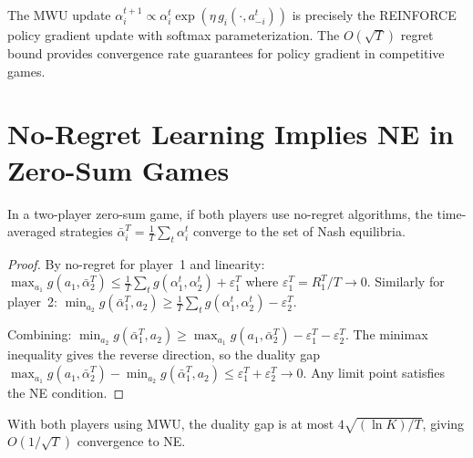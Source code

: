 \documentclass[11pt,a4paper]{article}
\begin{document}
\begin{rlconnection}[title={MWU and Policy Gradient}]
The MWU update $\alpha_i^{t+1} \propto \alpha_i^t\exp(\eta\,g_i(\cdot,
a_{-i}^t))$ is precisely the REINFORCE policy gradient update with
softmax parameterization. The $O(\sqrt{T})$ regret bound provides
convergence rate guarantees for policy gradient in competitive games.
\end{rlconnection}


\section{No-Regret Learning Implies NE in Zero-Sum Games}
\label{sec:no-regret-ne}

\begin{keyresult}[title={No-Regret to Nash Equilibrium}]
\begin{theorem}
\label{thm:no-regret-ne}
In a two-player zero-sum game, if both players use no-regret algorithms,
the time-averaged strategies $\bar{\alpha}_i^T = \frac{1}{T}\sum_t
\alpha_i^t$ converge to the set of Nash equilibria.
\end{theorem}
\end{keyresult}

\begin{proof}
By no-regret for player~1 and linearity:
$\max_{a_1}g(a_1, \bar{\alpha}_2^T)
\leq \frac{1}{T}\sum_t g(\alpha_1^t, \alpha_2^t) + \varepsilon_1^T$
where $\varepsilon_1^T = R_1^T/T \to 0$.
Similarly for player~2:
$\min_{a_2}g(\bar{\alpha}_1^T, a_2)
\geq \frac{1}{T}\sum_t g(\alpha_1^t, \alpha_2^t) - \varepsilon_2^T$.

Combining: $\min_{a_2}g(\bar{\alpha}_1^T, a_2) \geq
\max_{a_1}g(a_1, \bar{\alpha}_2^T) - \varepsilon_1^T - \varepsilon_2^T$.
The minimax inequality gives the reverse direction, so the duality gap
$\max_{a_1}g(a_1, \bar{\alpha}_2^T) - \min_{a_2}g(\bar{\alpha}_1^T, a_2)
\leq \varepsilon_1^T + \varepsilon_2^T \to 0$.
Any limit point satisfies the NE condition.
\end{proof}

\begin{corollary}
\label{cor:mwu-rate}
With both players using MWU, the duality gap is at most
$4\sqrt{(\ln K)/T}$, giving $O(1/\sqrt{T})$ convergence to NE.
\end{corollary}

\end{document}
